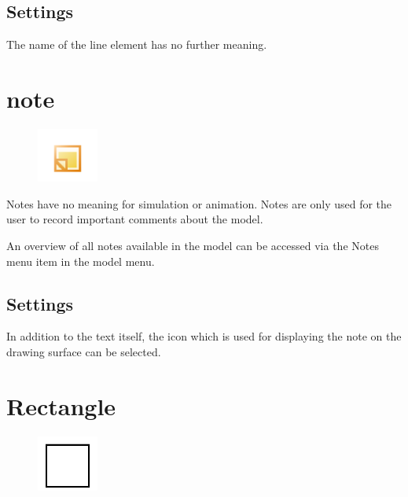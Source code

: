 \subsection*{Settings}

The name of the line element has no further meaning.


\section{note}
\label{ref:ModelElementNote}

\begin{figure}
\vspace{-22pt}
\includegraphics[width=2cm]{imageModelElementNote.png}
\vspace{-22pt}
\end{figure}

Notes have no meaning for simulation or animation.
Notes are only used for the user to record important comments about the model.

An overview of all notes available in the model can be accessed via
the Notes menu item in the model menu.

\subsection*{Settings}

In addition to the text itself, the icon which is used for displaying
the note on the drawing surface can be selected.


\section{Rectangle}
\label{ref:ModelElementRectangle}

\begin{figure}
\vspace{-22pt}
\includegraphics[width=2cm]{imageModelElementRectangle.png}
\vspace{-22pt}
\end{figure}

